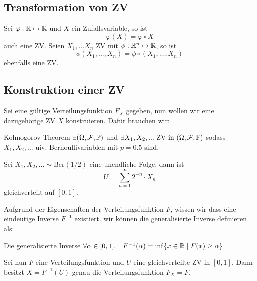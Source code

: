 \subsection{Transformation von ZV}

Sei $\varphi: \mathbb{R} \mapsto \mathbb{R}$ und $X$ ein Zufallsvariable, so ist 
$$\varphi(X) = \varphi \circ X$$ 
auch eine ZV. Seien $X_1,...X_n$ ZV mit $\phi: \mathbb{R}^n \mapsto \mathbb{R}$, so ist 
$$\phi(X_1, ..., X_n) = \phi \circ (X_1,...,X_n)$$
ebenfalls eine ZV.




\subsection{Konstruktion einer ZV}

Sei eine gültige Verteilungsfunktion $F_X$ gegeben, nun wollen wir eine dazugehörige ZV $X$ konstruieren. Dafür brauchen wir: \medskip

\begin{mainbox}
    {Kolmogorov Theorem}
    $\exists (\Omega, \mathcal{F}, \mathbb{P})$ und $\exists X_1, X_2, ... \text{ ZV in } (\Omega, \mathcal{F}, \mathbb{P})$ sodass $X_1, X_2, ...$ uiv. Bernoullivariablen mit $p = 0.5$ sind.
\end{mainbox}

Sei $X_1, X_2,... \sim \text{Ber}(1/2)$ eine unendliche Folge, dann ist 
$$U = \sum_{n = 1}^\infty 2^{-n}\cdot X_n$$ 
gleichverteilt auf $[0,1]$. \medskip

Aufgrund der Eigenschaften der Verteilungsfunktion $F$, wissen wir dass eine eindeutige Inverse $F^{-1}$ existiert. wir können die generalisierte Inverse definieren als: 
\begin{subbox}{Die generalisierte Inverse}
$\forall \alpha \in [0,1]. \quad F^{-1}(\alpha) = \inf \{x \in \mathbb{R} \; | \; F(x) \geq \alpha\}$
\end{subbox}

Sei nun $F$ eine Verteilungsfunktion und $U$ eine gleichverteilte ZV in $[0,1]$. Dann besitzt $X = F^{-1}(U)$ genau die Verteilungsfunktion $F_X = F$. 